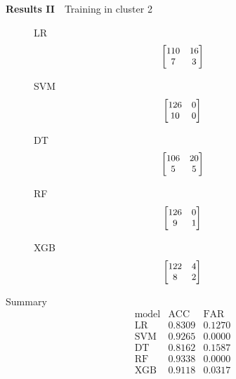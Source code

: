 \documentclass[12pt,aspectratio=43]{beamer}
\begin{document}
\begin{frame}{\textbf{Results II}　{Training in cluster 2}}
\linespread{0.9}
{\small
\begin{figure}[h]
\centering

\begin{minipage}{0.28\linewidth}
\raggedright
{\small LR}
$$
\small
\begin{bmatrix}
110 & 16 \\
7  & 3
\end{bmatrix}
$$
\end{minipage}
\begin{minipage}{0.28\linewidth}
\raggedright
{\small SVM}
$$
\small
\begin{bmatrix}
126 & 0 \\
10  & 0
\end{bmatrix}
$$
\end{minipage}
\begin{minipage}{0.28\linewidth}
\raggedright
{\small DT}
$$
\small
\begin{bmatrix}
106 & 20 \\
5  & 5
\end{bmatrix}
$$
\end{minipage}

\vspace{0.5em}

\begin{minipage}{0.28\linewidth}
\raggedright
{\small RF}
$$
\small
\begin{bmatrix}
126 & 0 \\
9  & 1
\end{bmatrix}
$$
\end{minipage}
\begin{minipage}{0.28\linewidth}
\raggedright
{\small XGB}
$$
\small
\begin{bmatrix}
122 & 4 \\
8  & 2
\end{bmatrix}
$$
\end{minipage}

\end{figure}
}

{\small
Summary
$$
\begin{array}{l|cc}
\text{model} & \text{ACC} & \text{FAR} \\
\hline
\text{LR} & 0.8309 & 0.1270 \\
\text{SVM}           & 0.9265 & 0.0000 \\
\text{DT}       & 0.8162 & 0.1587 \\
\text{RF}       & 0.9338 & 0.0000 \\
\text{XGB}            & 0.9118 & 0.0317 \\
\end{array}
$$
}

\end{frame}
\end{document}
